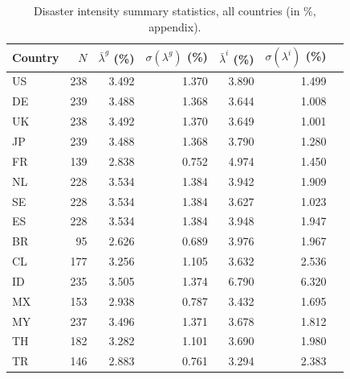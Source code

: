 \begin{table}[H]
\centering
\caption{Disaster intensity summary statistics, all countries (in \%, appendix).}
\label{tab:appendix_full_intensity_diagnostics}
\begin{tabular}{lrrrrrr}
\toprule
Country & $N$ & $\bar\lambda^g$ (\%) & $\sigma(\lambda^g)$ (\%) & $\bar\lambda^i$ (\%) & $\sigma(\lambda^i)$ (\%) \\
\midrule
US & 238 & 3.492 & 1.370 & 3.890 & 1.499 \\
DE & 239 & 3.488 & 1.368 & 3.644 & 1.008 \\
UK & 238 & 3.492 & 1.370 & 3.649 & 1.001 \\
JP & 239 & 3.488 & 1.368 & 3.790 & 1.280 \\
FR & 139 & 2.838 & 0.752 & 4.974 & 1.450 \\
NL & 228 & 3.534 & 1.384 & 3.942 & 1.909 \\
SE & 228 & 3.534 & 1.384 & 3.627 & 1.023 \\
ES & 228 & 3.534 & 1.384 & 3.948 & 1.947 \\
BR & 95 & 2.626 & 0.689 & 3.976 & 1.967 \\
CL & 177 & 3.256 & 1.105 & 3.632 & 2.536 \\
ID & 235 & 3.505 & 1.374 & 6.790 & 6.320 \\
MX & 153 & 2.938 & 0.787 & 3.432 & 1.695 \\
MY & 237 & 3.496 & 1.371 & 3.678 & 1.812 \\
TH & 182 & 3.282 & 1.101 & 3.690 & 1.980 \\
TR & 146 & 2.883 & 0.761 & 3.294 & 2.383 \\
\bottomrule
\end{tabular}
\end{table}
